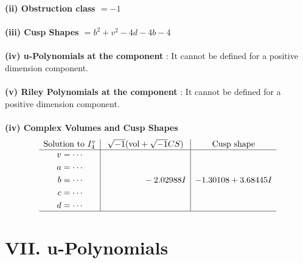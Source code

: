 \documentclass[1p]{elsarticle_modified}
\theoremstyle{definition}
\newcommand{\I}{\sqrt{-1}}
\begin{document}
\flushleft \textbf{(ii) Obstruction class $= -1$}\\~\\
\flushleft \textbf{(iii) Cusp Shapes $= b^2+v^2-4 d-4 b-4$}\\~\\
\flushleft \textbf{(iv) u-Polynomials at the component} : It cannot be defined for a positive dimension component.\\~\\
\flushleft \textbf{(v) Riley Polynomials at the component} : It cannot be defined for a positive dimension component.\\~\\
\newpage\flushleft \textbf{(iv) Complex Volumes and Cusp Shapes}
$$\begin{array}{c|c|c} 
\text{Solution to }I^v_{4}& \I (\text{vol} + \sqrt{-1}CS) & \text{Cusp shape}\\
 \hline 
\begin{aligned}
v &= \cdots \\
a &= \cdots \\
b &= \cdots \\
c &= \cdots \\
d &= \cdots\end{aligned}
 & \phantom{-0.000000 } -2.02988 I & -1.30108 + 3.68445 I\\
 \hline 
 \end{array}
$$
\newpage\renewcommand{\arraystretch}{1}
\centering \section*{ VII. u-Polynomials}
\end{document}
